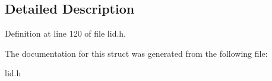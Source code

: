 \subsection{Detailed Description}


Definition at line 120 of file lid.\+h.



The documentation for this struct was generated from the following file\+:\begin{DoxyCompactItemize}
\item 
lid.\+h\end{DoxyCompactItemize}
